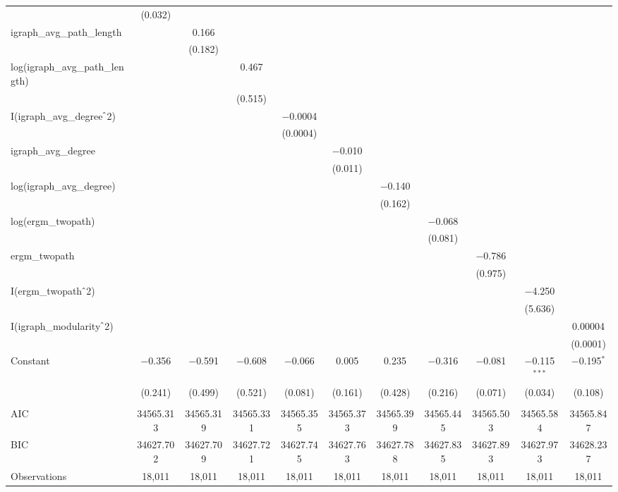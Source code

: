 \begin{table}[!htbp]
\begin{tabular}{@{\extracolsep{5pt}}lcccccccccc}
  & (0.032) &  &  &  &  &  &  &  &  &  \\ 
  igraph\_avg\_path\_length &  & 0.166 &  &  &  &  &  &  &  &  \\ 
  &  & (0.182) &  &  &  &  &  &  &  &  \\ 
  log(igraph\_avg\_path\_length) &  &  & 0.467 &  &  &  &  &  &  &  \\ 
  &  &  & (0.515) &  &  &  &  &  &  &  \\ 
  I(igraph\_avg\_degree$\hat{\mkern6mu}$2) &  &  &  & $-$0.0004 &  &  &  &  &  &  \\ 
  &  &  &  & (0.0004) &  &  &  &  &  &  \\ 
  igraph\_avg\_degree &  &  &  &  & $-$0.010 &  &  &  &  &  \\ 
  &  &  &  &  & (0.011) &  &  &  &  &  \\ 
  log(igraph\_avg\_degree) &  &  &  &  &  & $-$0.140 &  &  &  &  \\ 
  &  &  &  &  &  & (0.162) &  &  &  &  \\ 
  log(ergm\_twopath) &  &  &  &  &  &  & $-$0.068 &  &  &  \\ 
  &  &  &  &  &  &  & (0.081) &  &  &  \\ 
  ergm\_twopath &  &  &  &  &  &  &  & $-$0.786 &  &  \\ 
  &  &  &  &  &  &  &  & (0.975) &  &  \\ 
  I(ergm\_twopath$\hat{\mkern6mu}$2) &  &  &  &  &  &  &  &  & $-$4.250 &  \\ 
  &  &  &  &  &  &  &  &  & (5.636) &  \\ 
  I(igraph\_modularity$\hat{\mkern6mu}$2) &  &  &  &  &  &  &  &  &  & 0.00004 \\ 
  &  &  &  &  &  &  &  &  &  & (0.0001) \\ 
  Constant & $-$0.356 & $-$0.591 & $-$0.608 & $-$0.066 & 0.005 & 0.235 & $-$0.316 & $-$0.081 & $-$0.115$^{***}$ & $-$0.195$^{*}$ \\ 
  & (0.241) & (0.499) & (0.521) & (0.081) & (0.161) & (0.428) & (0.216) & (0.071) & (0.034) & (0.108) \\ 
 \hline \\[-1.8ex] 
AIC & 34565.313 & 34565.319 & 34565.331 & 34565.355 & 34565.373 & 34565.399 & 34565.445 & 34565.503 & 34565.584 & 34565.847 \\ 
BIC & 34627.702 & 34627.709 & 34627.721 & 34627.745 & 34627.763 & 34627.788 & 34627.835 & 34627.893 & 34627.973 & 34628.237 \\ 
Observations & 18,011 & 18,011 & 18,011 & 18,011 & 18,011 & 18,011 & 18,011 & 18,011 & 18,011 & 18,011 \\ 

\end{tabular}
\end{table}
